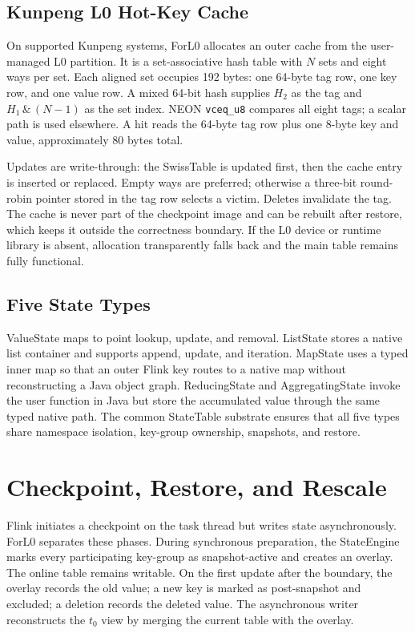 \documentclass[sigconf]{acmart}
\newcommand{\forlzero}{ForL0\xspace}
\newcommand{\system}{\forlzero}
\begin{document}
\subsection{Kunpeng L0 Hot-Key Cache}

On supported Kunpeng systems, \system allocates an outer cache from the user-managed L0 partition. It is a set-associative hash table with $N$ sets and eight ways per set. Each aligned set occupies 192 bytes: one 64-byte tag row, one key row, and one value row. A mixed 64-bit hash supplies $H_2$ as the tag and $H_1\,\&\,(N-1)$ as the set index. NEON \texttt{vceq\_u8} compares all eight tags; a scalar path is used elsewhere. A hit reads the 64-byte tag row plus one 8-byte key and value, approximately 80 bytes total.

Updates are write-through: the SwissTable is updated first, then the cache entry is inserted or replaced. Empty ways are preferred; otherwise a three-bit round-robin pointer stored in the tag row selects a victim. Deletes invalidate the tag. The cache is never part of the checkpoint image and can be rebuilt after restore, which keeps it outside the correctness boundary. If the L0 device or runtime library is absent, allocation transparently falls back and the main table remains fully functional.

\subsection{Five State Types}

ValueState maps to point lookup, update, and removal. ListState stores a native list container and supports append, update, and iteration. MapState uses a typed inner map so that an outer Flink key routes to a native map without reconstructing a Java object graph. ReducingState and AggregatingState invoke the user function in Java but store the accumulated value through the same typed native path. The common StateTable substrate ensures that all five types share namespace isolation, key-group ownership, snapshots, and restore.

\section{Checkpoint, Restore, and Rescale}

Flink initiates a checkpoint on the task thread but writes state asynchronously. \system separates these phases. During synchronous preparation, the StateEngine marks every participating key-group as snapshot-active and creates an overlay. The online table remains writable. On the first update after the boundary, the overlay records the old value; a new key is marked as post-snapshot and excluded; a deletion records the deleted value. The asynchronous writer reconstructs the $t_0$ view by merging the current table with the overlay.
\end{document}
